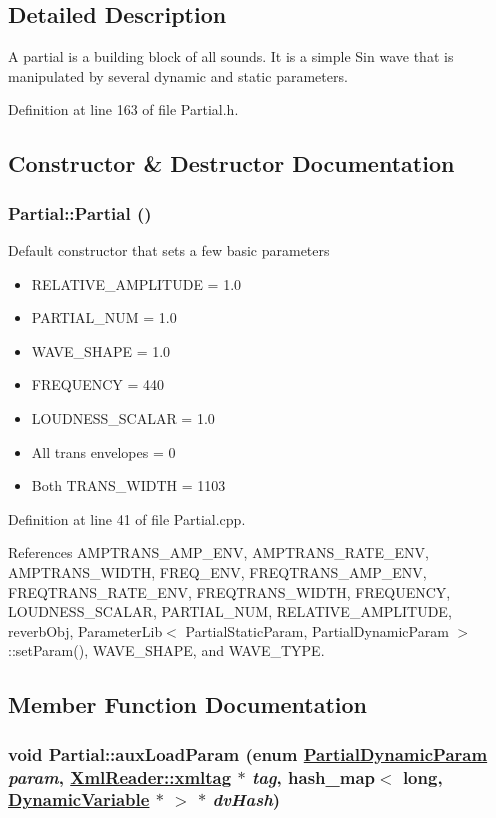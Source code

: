 \subsection{Detailed Description}
A partial is a building block of all sounds. It is a simple Sin wave that is manipulated by several dynamic and static parameters. 



Definition at line 163 of file Partial.h.

\subsection{Constructor \& Destructor Documentation}
\hypertarget{classPartial_a0}{
\subsubsection[Partial]{\setlength{\rightskip}{0pt plus 5cm}Partial::Partial ()}}
\label{classPartial_a0}


Default constructor that sets a few basic parameters\begin{itemize}
\item RELATIVE\_\-AMPLITUDE = 1.0\item PARTIAL\_\-NUM = 1.0\item WAVE\_\-SHAPE = 1.0\item FREQUENCY = 440\item LOUDNESS\_\-SCALAR = 1.0\item All trans envelopes = 0\item Both TRANS\_\-WIDTH = 1103 \end{itemize}


Definition at line 41 of file Partial.cpp.

References AMPTRANS\_\-AMP\_\-ENV, AMPTRANS\_\-RATE\_\-ENV, AMPTRANS\_\-WIDTH, FREQ\_\-ENV, FREQTRANS\_\-AMP\_\-ENV, FREQTRANS\_\-RATE\_\-ENV, FREQTRANS\_\-WIDTH, FREQUENCY, LOUDNESS\_\-SCALAR, PARTIAL\_\-NUM, RELATIVE\_\-AMPLITUDE, reverb\-Obj, Parameter\-Lib$<$ Partial\-Static\-Param, Partial\-Dynamic\-Param $>$::set\-Param(), WAVE\_\-SHAPE, and WAVE\_\-TYPE.

\subsection{Member Function Documentation}
\hypertarget{classPartial_d0}{
\subsubsection[auxLoadParam]{\setlength{\rightskip}{0pt plus 5cm}void Partial::aux\-Load\-Param (enum \hyperlink{Partial_8h_a20}{Partial\-Dynamic\-Param} {\em param}, \hyperlink{classXmlReader_1_1xmltag}{Xml\-Reader::xmltag} $\ast$ {\em tag}, hash\_\-map$<$ long, \hyperlink{classDynamicVariable}{Dynamic\-Variable} $\ast$ $>$ $\ast$ {\em dv\-Hash})}}
\label{classPartial_d0}


